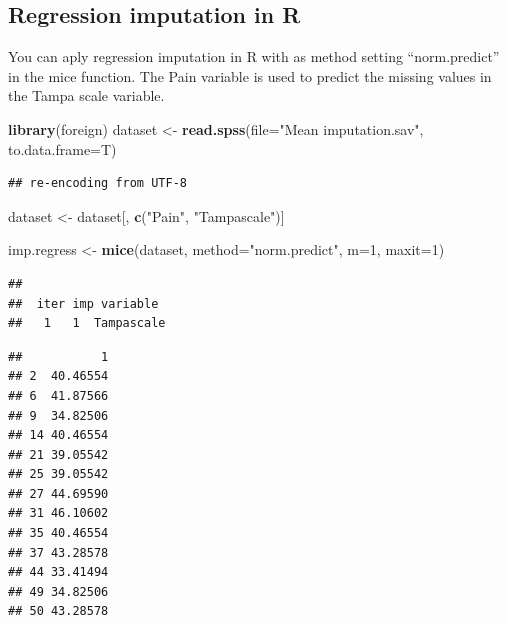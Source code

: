 \documentclass[]{book}
\newenvironment{Shaded}{\begin{snugshade}}{\end{snugshade}}
\newcommand{\KeywordTok}[1]{\textcolor[rgb]{0.13,0.29,0.53}{\textbf{#1}}}
\newcommand{\DataTypeTok}[1]{\textcolor[rgb]{0.13,0.29,0.53}{#1}}
\newcommand{\DecValTok}[1]{\textcolor[rgb]{0.00,0.00,0.81}{#1}}
\newcommand{\StringTok}[1]{\textcolor[rgb]{0.31,0.60,0.02}{#1}}
\newcommand{\CommentTok}[1]{\textcolor[rgb]{0.56,0.35,0.01}{\textit{#1}}}
\newcommand{\OperatorTok}[1]{\textcolor[rgb]{0.81,0.36,0.00}{\textbf{#1}}}
\newcommand{\NormalTok}[1]{#1}
\begin{document}
\subsection{Regression imputation in
R}\label{regression-imputation-in-r}

You can aply regression imputation in R with as method setting
``norm.predict'' in the mice function. The Pain variable is used to
predict the missing values in the Tampa scale variable.

\begin{Shaded}
\begin{Highlighting}[]
\KeywordTok{library}\NormalTok{(foreign)}
\NormalTok{dataset <-}\StringTok{ }\KeywordTok{read.spss}\NormalTok{(}\DataTypeTok{file=}\StringTok{"Mean imputation.sav"}\NormalTok{, }\DataTypeTok{to.data.frame=}\NormalTok{T)}
\end{Highlighting}
\end{Shaded}

\begin{verbatim}
## re-encoding from UTF-8
\end{verbatim}

\begin{Shaded}
\begin{Highlighting}[]
\NormalTok{dataset <-}\StringTok{ }\NormalTok{dataset[, }\KeywordTok{c}\NormalTok{(}\StringTok{"Pain"}\NormalTok{, }\StringTok{"Tampascale"}\NormalTok{)]}

\NormalTok{imp.regress <-}\StringTok{ }\KeywordTok{mice}\NormalTok{(dataset, }\DataTypeTok{method=}\StringTok{"norm.predict"}\NormalTok{, }\DataTypeTok{m=}\DecValTok{1}\NormalTok{, }\DataTypeTok{maxit=}\DecValTok{1}\NormalTok{)}
\end{Highlighting}
\end{Shaded}

\begin{verbatim}
## 
##  iter imp variable
##   1   1  Tampascale
\end{verbatim}

\begin{Shaded}
\end{Shaded}

\begin{verbatim}
##           1
## 2  40.46554
## 6  41.87566
## 9  34.82506
## 14 40.46554
## 21 39.05542
## 25 39.05542
## 27 44.69590
## 31 46.10602
## 35 40.46554
## 37 43.28578
## 44 33.41494
## 49 34.82506
## 50 43.28578
\end{verbatim}
\end{document}

